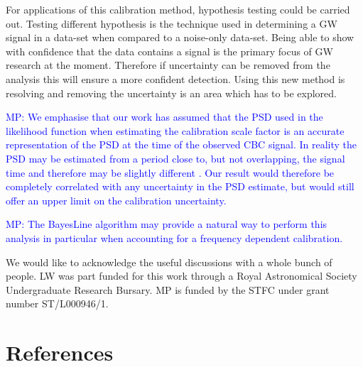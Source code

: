 \documentclass[12pt]{iopart}
\newcommand{\MP}[1]{\textcolor{blue}{MP: #1}}
\begin{document}
For applications of this calibration method, hypothesis testing could be
carried out. Testing different hypothesis is the technique used in determining
a GW signal in a data-set when compared to a noise-only data-set. Being able to
show with confidence that the data contains a signal is the primary focus of GW
research at the moment. Therefore if uncertainty can be removed from the
analysis this will ensure a more confident detection. Using this new method is
resolving and removing the uncertainty is an area which has to be explored.

\MP{We emphasise that our work has assumed that the PSD used in the likelihood function
when estimating the calibration scale factor is an accurate representation of the
PSD at the time of the observed CBC signal. In reality the PSD may be estimated from
a period close to, but not overlapping, the signal time and therefore may be slightly
different \cite{2013PhRvD..88h4044L}. Our result would therefore be completely correlated
with any uncertainty in the PSD estimate, but would still offer an upper limit
on the calibration uncertainty.}

\MP{The BayesLine algorithm \cite{2015PhRvD..91h4034L} may provide a natural
way to perform this analysis in particular when accounting for a frequency
dependent calibration.}

\ack

We would like to acknowledge the useful discussions with a whole bunch
of people. LW was part funded for this work through a Royal Astronomical
Society Undergraduate Research Bursary.
MP is funded by the STFC under grant number ST/L000946/1.

\section*{References}



\end{document}
